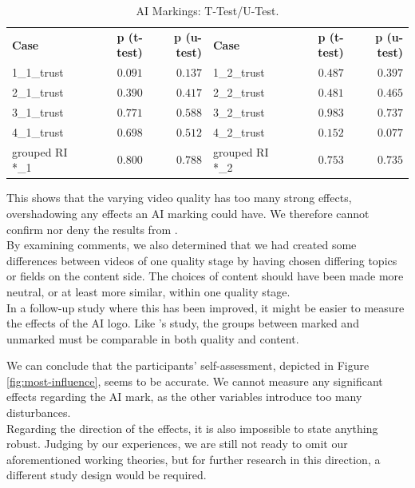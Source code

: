 \documentclass[
  a4paper,  %
  twoside,  %
  bibliography=totoc,
  headsepline,
  cleardoublepage=empty,
  parskip=half,
  draft=false
]{scrbook}
\begin{document}
\begin{table}[h]
	\centering
	\caption{AI Markings: T-Test/U-Test.}
	\label{tab:ttest_logo-trust}
	{
		\begin{tabular}{lrr|lrr}
			\toprule
			\textbf{Case} & \textbf{p (t-test)} & \textbf{p (u-test)} & \textbf{Case} & \textbf{p (t-test)} & \textbf{p (u-test)}  \\
			\cmidrule[0.4pt]{1-6}
			1\_1\_trust & $0.091$ & $0.137$ & 1\_2\_trust & $0.487$ & $0.397$ \\
			2\_1\_trust & $0.390$ & $0.417$ & 2\_2\_trust & $0.481$ & $0.465$ \\
			3\_1\_trust & $0.771$ & $0.588$ & 3\_2\_trust & $0.983$ & $0.737$ \\
			4\_1\_trust & $0.698$ & $0.512$ & 4\_2\_trust & $0.152$ & $0.077$ \\
			grouped RI *\_1 & $0.800$ & $0.788$ & grouped RI *\_2 & $0.753$ & $0.735$\\
			\bottomrule
		\end{tabular}
	}
\end{table}

This shows that the varying video quality has too many strong effects, overshadowing any effects an AI marking could have. We therefore cannot confirm nor deny the results from .\\
By examining comments, we also determined that we had created some differences between videos of one quality stage by having chosen differing topics or fields on the content side. The choices of content should have been made more neutral, or at least more similar, within one quality stage. \\
In a follow-up study where this has been improved, it might be easier to measure the effects of the AI logo. Like 's study, the groups between marked and unmarked must be comparable in both quality and content.

We can conclude that the participants' self-assessment, depicted in Figure \ref{fig:most-influence}, seems to be accurate. We cannot measure any significant effects regarding the AI mark, as the other variables introduce too many disturbances. \\
Regarding the direction of the effects, it is also impossible to state anything robust. Judging by our experiences, we are still not ready to omit our aforementioned working theories, but for further research in this direction, a different study design would be required.
\end{document}
